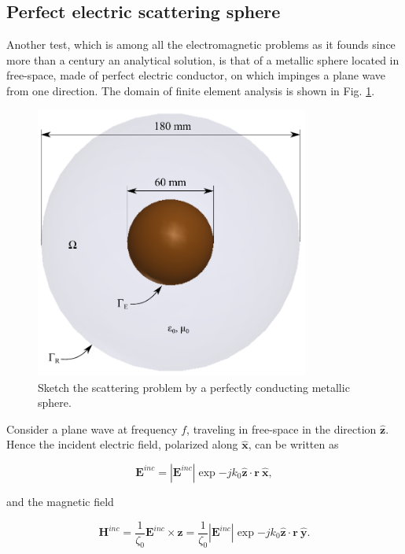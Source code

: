 \clearpage
\subsection{Perfect electric scattering sphere}

Another test, which is  among all the electromagnetic problems as it founds since more than a century an analytical solution, is that of a metallic sphere located in free-space, made of perfect electric conductor, on which impinges a plane wave from one direction. The domain of finite element analysis is shown in Fig. \ref{fig:Sphere}.

\begin{figure}[ht!]
\centering
\includegraphics[width=9cm]{Sphere}
\caption{Sketch the scattering problem by a perfectly conducting metallic sphere.}
\label{fig:Sphere}
\end{figure}

Consider a plane wave at frequency $f$, traveling in free-space in the direction $\hat{\mathbf{z}}$. Hence the incident electric field, polarized along $\hat{\mathbf{x}}$, can be written as

$$\mathbf{E}^{inc} = | \mathbf{E}^{inc}| \exp{-jk_0 \hat{\mathbf{z}} \cdot \mathbf{r} } \ \hat{\mathbf{x}},$$

\noindent and the magnetic field

$$\mathbf{H}^{inc} = \frac{1}{\zeta_0} \mathbf{E}^{inc} \times \hat{\mathbf{z}} =  \frac{1}{\zeta_0}| \mathbf{E}^{inc}| \exp{-jk_0 \hat{\mathbf{z}} \cdot \mathbf{r} } \ \hat{\mathbf{y}}.$$

